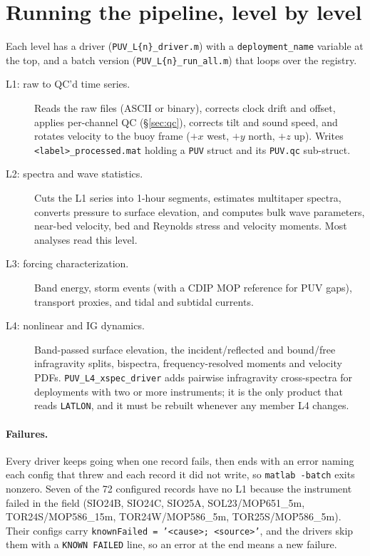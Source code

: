\documentclass[11pt]{article}
\newcommand{\code}[1]{\texttt{#1}}
\begin{document}
\section{Running the pipeline, level by level}
\label{sec:running}

Each level has a driver (\code{PUV\_L\{n\}\_driver.m}) with a \code{deployment\_name} variable at
the top, and a batch version (\code{PUV\_L\{n\}\_run\_all.m}) that loops over the registry.

\begin{description}
\item[L1: raw to QC'd time series.] Reads the raw files (ASCII or binary), corrects clock drift
  and offset, applies per-channel QC (\S\ref{sec:qc}), corrects tilt and sound speed, and
  rotates velocity to the buoy frame ($+x$ west, $+y$ north, $+z$ up). Writes
  \code{<label>\_processed.mat} holding a \code{PUV} struct and its \code{PUV.qc} sub-struct.
\item[L2: spectra and wave statistics.] Cuts the L1 series into 1-hour segments, estimates
  multitaper spectra, converts pressure to surface elevation, and computes bulk wave parameters,
  near-bed velocity, bed and Reynolds stress and velocity moments. Most analyses read this level.
\item[L3: forcing characterization.] Band energy, storm events (with a CDIP MOP reference for
  PUV gaps), transport proxies, and tidal and subtidal currents.
\item[L4: nonlinear and IG dynamics.] Band-passed surface elevation, the incident/reflected and
  bound/free infragravity splits, bispectra, frequency-resolved moments and velocity PDFs.
  \code{PUV\_L4\_xspec\_driver} adds pairwise infragravity cross-spectra for deployments with two
  or more instruments; it is the only product that reads \code{LATLON}, and it must be rebuilt
  whenever any member L4 changes.
\end{description}

\paragraph{Failures.} Every driver keeps going when one record fails, then ends with an error
naming each config that threw and each record it did not write, so \code{matlab -batch} exits
nonzero. Seven of the 72 configured records have no L1 because the instrument failed in the
field (SIO24B, SIO24C, SIO25A, SOL23/MOP651\_5m, TOR24S/MOP586\_15m, TOR24W/MOP586\_5m,
TOR25S/MOP586\_5m). Their configs carry \code{knownFailed = '<cause>; <source>'}, and the drivers
skip them with a \code{KNOWN FAILED} line, so an error at the end means a new failure.
\end{document}
